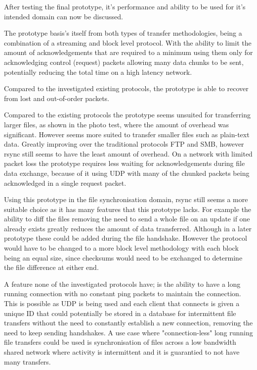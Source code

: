 After testing the final prototype, it's performance and ability to be used for it's intended domain can now be discussed.

The prototype basis's itself from both types of transfer methodologies, being a combination of a streaming and block level protocol. With the ability to limit the amount of acknowledgements that are required to a minimum using them only for acknowledging control (request) packets allowing many data chunks to be sent, potentially reducing the total time on a high latency network.

Compared to the investigated existing protocols, the prototype is able to recover from lost and out-of-order packets.

Compared to the existing protocols the prototype seems unsuited for transferring larger files, as shown in the photo test, where the amount of overhead was significant. However seems more suited to transfer smaller files such as plain-text data. Greatly improving over the traditional protocols FTP and SMB, however rsync still seems to have the least amount of overhead. On a network with limited packet loss the prototype requires less waiting for acknowledgements during file data exchange, because of it using UDP with many of the chunked packets being acknowledged in a single request packet.

Using this prototype in the file synchronisation domain, rsync still seems a more suitable choice as it has many features that this prototype lacks. For example the ability to diff the files removing the need to send a whole file on an update if one already exists greatly reduces the amount of data transferred. Although in a later prototype these could be added during the file handshake. However the protocol would have to be changed to a more block level methodology with each block being an equal size, since checksums would need to be exchanged to determine the file difference at either end.

A feature none of the investigated protocols have; is the ability to have a long running connection with no constant ping packets to maintain the connection. This is possible as UDP is being used and each client that connects is given a unique ID that could potentially be stored in a database for intermittent file transfers without the need to constantly establish a new connection, removing the need to keep sending handshakes. A use case where "connection-less" long running file transfers could be used is synchronisation of files across a low bandwidth shared network where activity is intermittent and it is guarantied to not have many transfers.
